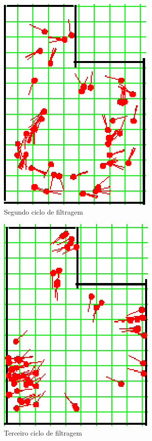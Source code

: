 \begin{figure}[H]
  \centering
  \includegraphics[scale=0.6]{figuras/cen1_ex3/3.eps}
  \caption[Segundo Ciclo de Filtragem]{Segundo ciclo de filtragem}
  \label{img:cen1_ex3_3}
\end{figure}

\begin{figure}[H]
  \centering
  \includegraphics[scale=0.6]{figuras/cen1_ex3/4.eps}
  \caption[Terceiro Ciclo de Filtragem]{Terceiro ciclo de filtragem}
  \label{img:cen1_ex3_4}
\end{figure}

